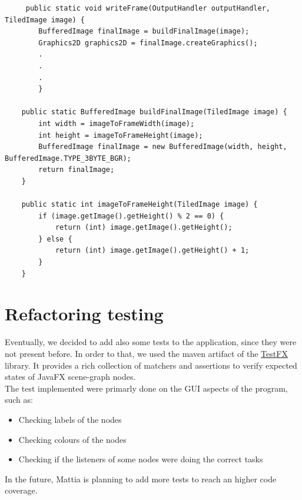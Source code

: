 \documentclass{article}
\begin{document}
\begin{minipage}{0.5 \textwidth}
\begin{lstlisting}
     public static void writeFrame(OutputHandler outputHandler, TiledImage image) {
        BufferedImage finalImage = buildFinalImage(image);
        Graphics2D graphics2D = finalImage.createGraphics();
        .
        .
        .
        }
        
    public static BufferedImage buildFinalImage(TiledImage image) {
        int width = imageToFrameWidth(image);
        int height = imageToFrameHeight(image);
        BufferedImage finalImage = new BufferedImage(width, height, BufferedImage.TYPE_3BYTE_BGR);
        return finalImage;
    }
    
    public static int imageToFrameHeight(TiledImage image) {
        if (image.getImage().getHeight() % 2 == 0) {
            return (int) image.getImage().getHeight();
        } else {
            return (int) image.getImage().getHeight() + 1;
        }
    }
\end{lstlisting}
\end{minipage}


\section{Refactoring testing} 
Eventually, we decided to add also some tests to the application, since they were not present before. In order to that, we used the maven artifact of the \href{https://github.com/TestFX/TestFX}{TestFX} library. It provides a rich collection of matchers and assertions to verify expected states of JavaFX scene-graph nodes. \\
The test implemented were primarly done on the GUI aspects of the program, such as:

\begin{itemize}
    \item Checking labels of the nodes
    \item Checking colours of the nodes
    \item Checking if the listeners of some nodes were doing the correct tasks
\end{itemize}
In the future, Mattia is planning to add more tests to reach an higher code coverage.
\end{document}
